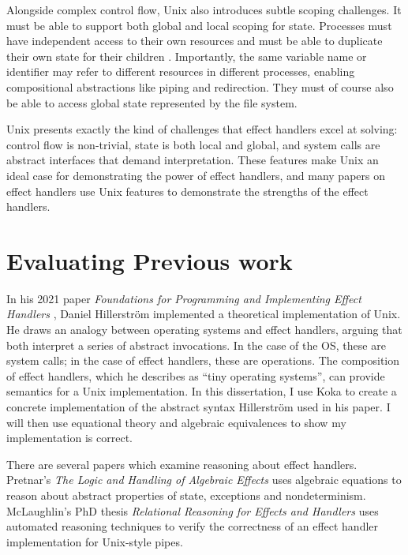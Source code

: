 \documentclass[logo,bsc,singlespacing,parskip]{infthesis}
\begin{document}
Alongside complex control flow, Unix also introduces subtle scoping challenges. It must be able to support both global and local scoping for state. Processes must have independent access to their own resources and must be able to duplicate their own state for their children \cite{aiken2006deconstructing}. Importantly, the same variable name or identifier may refer to different resources in different processes, enabling compositional abstractions like piping and redirection. They must of course also be able to access global state represented by the file system.

Unix presents exactly the kind of challenges that effect handlers excel at solving: control flow is non-trivial, state is both local and global, and system calls are abstract interfaces that demand interpretation. These features make Unix an ideal case for demonstrating the power of effect handlers, and many papers on effect handlers use Unix features to demonstrate the strengths of the effect handlers.



\section{Evaluating Previous work}
In his 2021 paper \textit{Foundations for Programming and Implementing Effect Handlers} \cite{hillerstrom_foundations_nodate}, Daniel Hillerström implemented a theoretical implementation of Unix. He draws an analogy between operating systems and effect handlers, arguing that both interpret a series of abstract invocations. In the case of the OS, these are system calls; in the case of effect handlers, these are operations. The composition of effect handlers, which he describes as “tiny operating systems”, can provide semantics for a Unix implementation. In this dissertation, I use Koka to create a concrete implementation of the abstract syntax Hillerström used in his paper. I will then use equational theory and algebraic equivalences to show my implementation is correct.

There are several papers which examine reasoning about effect handlers. Pretnar's \textit{The Logic and Handling of Algebraic Effects} \cite{Pretnar:2010} uses algebraic equations to reason about abstract properties of state, exceptions and nondeterminism. McLaughlin's PhD thesis \textit{Relational Reasoning for Effects and Handlers} \cite{McLaughlin2020} uses automated reasoning techniques to verify the correctness of an effect handler implementation for Unix-style pipes. 
\end{document}
